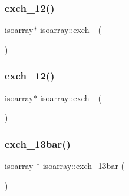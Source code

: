 \subsubsection{\texorpdfstring{exch\_12()}{exch\_12()}\hspace{0.1cm}{\footnotesize\ttfamily [2/3]}}
{\footnotesize\ttfamily \mbox{\hyperlink{classisoarray}{isoarray}}$\ast$ isoarray\+::exch\+\_ (\begin{DoxyParamCaption}{ }\end{DoxyParamCaption})}

\mbox{\label{classisoarray_ac56742183c8846ff2a5b315d1fc0b90b}} 
\subsubsection{\texorpdfstring{exch\_12()}{exch\_12()}\hspace{0.1cm}{\footnotesize\ttfamily [3/3]}}
{\footnotesize\ttfamily \mbox{\hyperlink{classisoarray}{isoarray}}$\ast$ isoarray\+::exch\+\_ (\begin{DoxyParamCaption}{ }\end{DoxyParamCaption})}

\mbox{\label{classisoarray_ac9b13ab94dad05014c087cc89776eeff}} 
\subsubsection{\texorpdfstring{exch\_13bar()}{exch\_13bar()}\hspace{0.1cm}{\footnotesize\ttfamily [1/3]}}
{\footnotesize\ttfamily \mbox{\hyperlink{classisoarray}{isoarray}} $\ast$ isoarray\+::exch\+\_\+13bar (\begin{DoxyParamCaption}{ }\end{DoxyParamCaption})}

